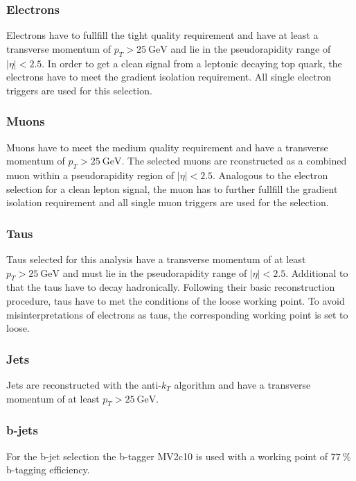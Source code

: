 \subsubsection*{Electrons}
Electrons have to fullfill the tight quality requirement and have at least a transverse momentum of $p_T>\SI{25}{\giga\electronvolt}$ and lie in the pseudorapidity range of $|\eta|<2.5$. In order to get a clean signal from a leptonic decaying top quark, the electrons have to meet the gradient isolation requirement. All single electron triggers are used for this selection.
\subsubsection*{Muons}
Muons have to meet the medium quality requirement and have a transverse momentum of $p_T>\SI{25}{\giga\electronvolt}$. The selected muons are rconstructed as a combined muon within a pseudorapidity region of $|\eta|<2.5$. Analogous to the electron selection for a clean lepton signal, the muon has to further fullfill the gradient isolation requirement and all single muon triggers are used for the selection.
\subsubsection*{Taus}
Taus selected for this analysis have a transverse momentum of at least $p_T>\SI{25}{\giga\electronvolt}$ and must lie in the pseudorapidity range of $|\eta|<2.5$. Additional to that the taus have to decay hadronically. Following their basic reconstruction procedure, taus have to met the conditions of the loose working point. To avoid misinterpretations of electrons as taus, the corresponding working point is set to loose.
\subsubsection*{Jets}
Jets are reconstructed with the anti-$k_T$ algorithm and have a transverse momentum of at least $p_T>\SI{25}{\giga\electronvolt}$. 
\subsubsection*{b-jets}
For the b-jet selection the b-tagger MV2c10 is used with a working point of $\SI{77}{\percent}$ b-tagging efficiency.
